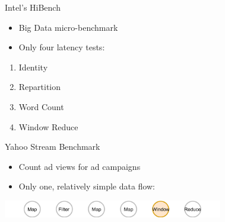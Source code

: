 \documentclass[14pt,t]{beamer}
\renewcommand{\title}[1]{
  {\huge #1} \vskip 0.4cm
}
\begin{document}
\begin{frame}
  \title{Intel's HiBench}
  \begin{itemize}
  \item Big Data micro-benchmark
  \item Only four latency tests:
  \end{itemize}
  \begin{enumerate}
  \item Identity \hfill{}
  \item Repartition \hfill{}
  \item Word Count \hfill{}
  \item Window Reduce \hfill{}
  \end{enumerate}
\end{frame}

\begin{frame}
  \title{Yahoo Stream Benchmark}
  \begin{itemize}
  \item Count ad views for ad campaigns
  \item Only one, relatively simple data flow:
  \end{itemize}
  \includegraphics[height=0.75cm]{ysb.png}
\end{frame}
\end{document}
